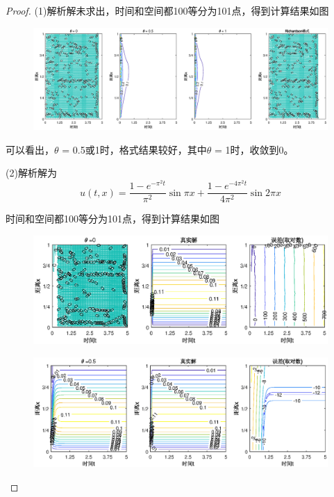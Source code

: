 \documentclass{article}%
\begin{document}
\begin{proof}
\par
(1)解析解未求出，时间和空间都100等分为101点，得到计算结果如图

\begin{figure}[H]
	\includegraphics[width=1\linewidth]{week12_1_1.eps}
	\label{Fig:1.1}
\end{figure}


可以看出，$\theta$ = 0.5或1时，格式结果较好，其中$\theta$ = 1时，收敛到0。

(2)解析解为$$ u(t,x)=\frac{1-e^{-\pi^2t}}{\pi^2}\sin \pi x + \frac{1-e^{-4\pi^2t}}{4\pi^2}\sin 2\pi x $$

时间和空间都100等分为101点，得到计算结果如图

\begin{figure}[H]
	\includegraphics[width=1\linewidth]{week12_2_1.eps}
	\label{Fig:2.1}
\end{figure}

\begin{figure}[H]
	\includegraphics[width=1\linewidth]{week12_2_2.eps}
	\label{Fig:2.2}
\end{figure}


\end{proof}
\end{document}
